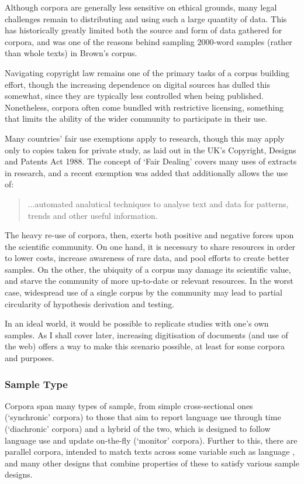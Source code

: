 Although corpora are generally less sensitive on ethical grounds, many legal challenges remain to distributing and using such a large quantity of data.  This has historically greatly limited both the source and form of data gathered for corpora, and was one of the reasons behind sampling 2000-word samples (rather than whole texts) in Brown's corpus.

Navigating copyright law remains one of the primary tasks of a corpus building effort, though the increasing dependence on digital sources has dulled this somewhat, since they are typically less controlled when being published.  Nonetheless, corpora often come bundled with restrictive licensing, something that limits the ability of the wider community to participate in their use.

Many countries' fair use exemptions apply to research, though this may apply only to copies taken for private study, as laid out in the UK's Copyright, Designs and Patents Act 1988.  The concept of `Fair Dealing' covers many uses of extracts in research, and a recent exemption was added that additionally allows the use of\cite{intellectualpropertyofficeuk2014}:

\begin{quote}
...automated analutical techniques to analyse text and data for patterns, trends and other useful information.
\end{quote}





The heavy re-use of corpora, then, exerts both positive and negative forces upon the scientific community.  On one hand, it is necessary to share resources in order to lower costs, increase awareness of rare data, and pool efforts to create better samples.  On the other, the ubiquity of a corpus may damage its scientific value, and starve the community of more up-to-date or relevant resources.  In the worst case, widespread use of a single corpus by the community may lead to partial circularity of hypothesis derivation and testing.

In an ideal world, it would be possible to replicate studies with one's own samples.  As I shall cover later, increasing digitisation of documents (and use of the web) offers a way to make this scenario possible, at least for some corpora and purposes.



\subsubsection{Sample Type}
Corpora span many types of sample, from simple cross-sectional ones (`synchronic' corpora) to those that aim to report language use through time (`diachronic' corpora) and a hybrid of the two, which is designed to follow language use and update on-the-fly (`monitor' corpora).  Further to this, there are parallel corpora, intended to match texts across some variable such as language
, and many other designs that combine properties of these to satisfy various sample designs.

